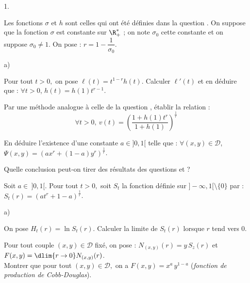 \begin{noliste}{1.}
 
 
 \item Les fonctions $\sigma$ et $h$ sont celles qui ont été définies 
 dans la question . On suppose que la fonction $\sigma$ est 
 constante sur $\R_+^*$ ; on note $\sigma_0$ cette constante et on 
 suppose $\sigma_0 \neq 1$. On pose : $r=1-\dfrac{1}{\sigma_0}$.
 \begin{noliste}{a)}
  \setlength{\itemsep}{2mm}
  \item\label{7a} Pour tout $t>0,$ on pose $\ell(t)=t^{1-r}h(t)$.
  Calculer $\ell'(t)$ et en déduire que : $\forall t >0$, 
  $h(t)=h(1)t^{r-1}$.
  
  

  
  \item Par une méthode analogue à celle de la question , 
  établir la relation : 
  \[
  \forall t >0, \  
  v(t)=\left(\dfrac{1+h(1)t^r}{1+h(1)}\right)^{\frac{1}{r}}
  \]
  
  

  
  \item\label{7c} En déduire l'existence d'une constante $a \in ]0,1[$ 
  telle que : $\forall (x,y) \in \mathcal{D}$, 
  $\Psi(x,y)=\left(ax^r+(1-a)y^r\right)^{\frac{1}{r}}$.
  
  
  
  
  
  
  
  
  

  
  \item Quelle conclusion peut-on tirer des résultats des questions 
  \itbf{3.b)} et \itbf{7.c)} ?
  
  
 \end{noliste}
 
 \item Soit $a \in \ ]0,1[$. Pour tout $t>0,$ soit $S_t$ la fonction 
 définie sur $]-\infty,1[ \setminus \{0\}$ par : 
 $S_t(r)=(at^r+1-a)^{\frac{1}{r}}$.
 \begin{noliste}{a)}
  \setlength{\itemsep}{2mm}
  \item On pose $H_t(r)=\ln S_t(r)$. Calculer la limite de $S_t(r)$ 
  lorsque $r$ tend vers 0.
  
  
  
  
  
  
  
  
  

  
  \item Pour tout couple $(x,y) \in \mathcal{D}$ fixé, on pose : 
  $N_{(x,y)}(r) = y \, S_z(r)$ et $F(x,y)=\dlim{r \to 0} 
  N_{(x,y)}(r)$.\\
  Montrer que pour tout $(x,y) \in \mathcal{D},$ on a 
  $F(x,y)=x^a \, y^{1-a}$ ({\it fonction de production de 
  Cobb-Douglas}).
  
  
 \end{noliste}
\end{noliste}





